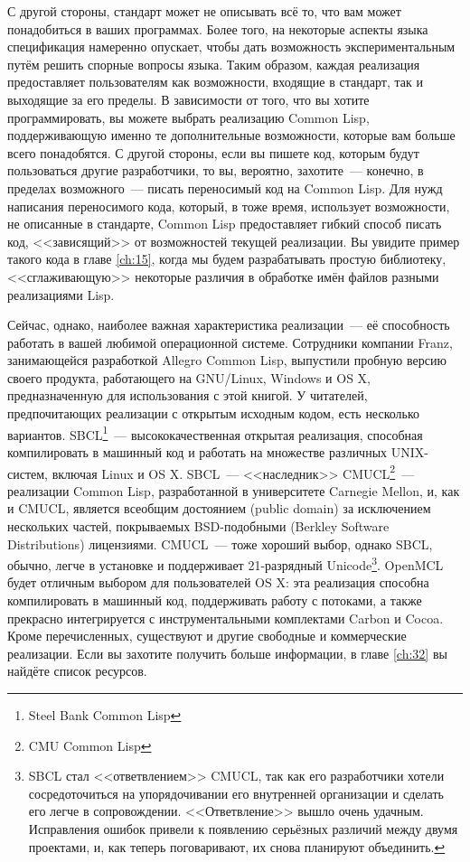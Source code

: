 С другой стороны, стандарт может не описывать всё то, что вам может понадобиться в
ваших программах. Более того, на некоторые аспекты языка спецификация намеренно
опускает, чтобы дать возможность экспериментальным путём решить спорные вопросы языка.
Таким образом, каждая реализация предоставляет пользователям как возможности, входящие в
стандарт, так и выходящие за его пределы. В зависимости от того, что вы хотите
программировать, вы можете выбрать реализацию Common Lisp, поддерживающую именно те
дополнительные возможности, которые вам больше всего понадобятся. С другой стороны,
если вы пишете код, которым будут пользоваться другие разработчики, то
вы, вероятно, захотите~--- конечно, в пределах возможного~--- писать переносимый код на
Common Lisp. Для нужд написания переносимого кода, который, в тоже время, использует
возможности, не описанные в стандарте, Common Lisp предоставляет гибкий способ писать код,
<<зависящий>> от возможностей текущей реализации. Вы увидите пример такого кода в главе
\ref{ch:15}, когда мы будем разрабатывать простую библиотеку, <<сглаживающую>> некоторые
различия в обработке имён файлов разными реализациями Lisp.

Сейчас, однако, наиболее важная характеристика реализации~--- её способность работать в
вашей любимой операционной системе. Сотрудники компании Franz, занимающейся разработкой
Allegro Common Lisp, выпустили пробную версию своего продукта, работающего на GNU/Linux,
Windows и OS X, предназначенную для использования с этой книгой. У читателей,
предпочитающих реализации с открытым исходным кодом, есть несколько
вариантов. SBCL\footnote{Steel Bank Common Lisp}~--- высококачественная открытая
реализация, способная компилировать в машинный код и работать на множестве различных
UNIX-систем, включая Linux и OS X. SBCL~--- <<наследник>> CMUCL\footnote{CMU Common
  Lisp}~--- реализации Common Lisp, разработанной в университете Carnegie Mellon,
и, как и CMUCL, является всеобщим достоянием (public domain) за исключением нескольких
частей, покрываемых BSD-подобными (Berkley Software Distributions) лицензиями. CMUCL~---
тоже хороший выбор, однако SBCL, обычно, легче в установке и поддерживает 21-разрядный
Unicode\footnote{SBCL стал <<ответвлением>> CMUCL, так как его разработчики хотели
  сосредоточиться на упорядочивании его внутренней организации и сделать его легче в
  сопровождении. <<Ответвление>> вышло очень удачным. Исправления ошибок привели к появлению
  серьёзных различий между двумя проектами, и, как теперь поговаривают, их снова планируют
  объединить.}. OpenMCL будет отличным выбором для пользователей OS X: эта
реализация способна компилировать в машинный код, поддерживать работу с потоками, а также
прекрасно интегрируется с инструментальными комплектами Carbon и Cocoa. Кроме
перечисленных, существуют и другие свободные и коммерческие реализации. Если вы захотите
получить больше информации, в главе \ref{ch:32} вы найдёте список ресурсов.

